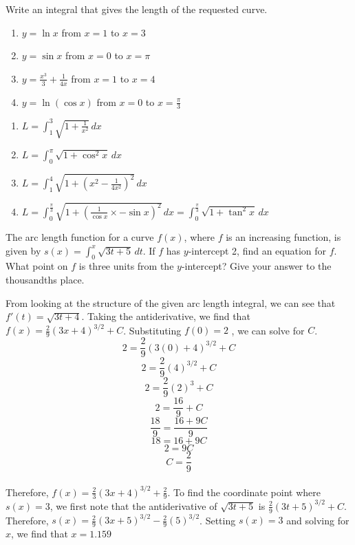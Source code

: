 \begin{Exercise}[label=length1]
Write an integral that gives the length of the requested curve.
	\begin{enumerate}
	\item $y = \ln{x}$ from $x = 1$ to $x = 3$
	\item $y = \sin{x}$ from $x = 0$ to $x = \pi$
	\item $y = \frac{x^3}{3} + \frac{1}{4x}$ from $x = 1$ to $x = 4$
	\item $y = \ln{(\cos{x})}$ from $x = 0$ to $x = \frac{\pi}{3}$
	\end{enumerate}	 
\end{Exercise}

\begin{Answer}[ref=length1]
	\begin{enumerate}
	\item $L = \int_{1}^{3} \sqrt{1 + \frac{1}{x^2}}\,dx$
	\item $L = \int_{0}^{\pi} \sqrt{1 + \cos^2{x}}\,dx$
	\item $L = \int_{1}^{4} \sqrt{1 + (x^2-\frac{1}{4x^2})^2}\,dx$
	\item $L = \int_{0}^{\frac{\pi}{3}} \sqrt{1 + (\frac{1}{\cos{x}} 
	\times - \sin{x})^2}\,dx = \int_{0}^{\frac{\pi}{3}} \sqrt{1 + 
	\tan^2{x}}\,dx$
	\end{enumerate}
\end{Answer}

\begin{Exercise}[label=length2]
The arc length function for a curve $f(x)$, where $f$ is an increasing 
function, is given by $s(x) = \int_{0}^{x} \sqrt{3t + 5}\,dt$. If $f$ 
has $y$-intercept 2, find an equation for $f$. What point on $f$ is 
three units from the $y$-intercept? Give your answer to the thousandths 
place. 
\end{Exercise}

\begin{Answer}[ref=length2]
From looking at the structure of the given arc length integral, we can 
see that $f'(t) = \sqrt{3t + 4}$. Taking the antiderivative, we find 
that $f(x) = \frac{2}{9}(3x + 4)^{3 / 2} + C$. Substituting $f(0) = 2$
, we can solve for $C$. $$2 = \frac{2}{9}(3(0) + 4)^{3 / 2} + C$$ 
$$2 = \frac{2}{9}(4)^{3 / 2} + C$$ 
$$2 = \frac{2}{9}(2)^3 + C$$ 
$$2 = \frac{16}{9} + C$$ 
$$\frac{18}{9} = \frac{16 + 9C}{9}$$ 
$$18 = 16 + 9C$$ 
$$2 = 9C$$ 
$$C = \frac{2}{9}$$\\ 
Therefore, $f(x) = \frac{2}{3}(3x + 4)^{3 / 2} + \frac{2}{9}$. To find 
the coordinate point where $s(x) = 3$, we first note that the 
antiderivative of $\sqrt{3t + 5}$ is $\frac{2}{9}(3t + 5)^{3 / 2} + C$. 
Therefore, $s(x) = \frac{2}{9}(3x + 5)^{3 / 2} - \frac{2}{9}(5)^{3 / 2}$. 
Setting $s(x) = 3$ and solving for $x$, we find that $x = 1.159$
\end{Answer}

